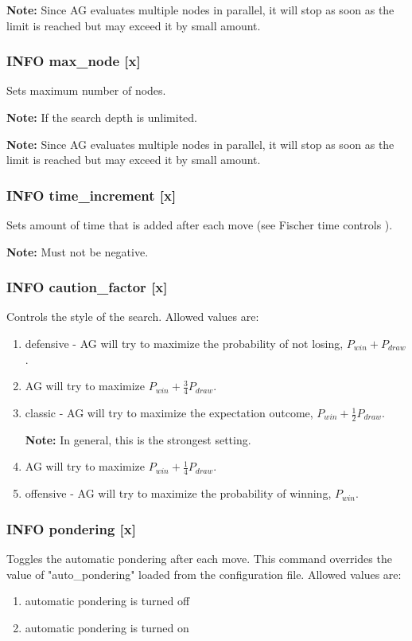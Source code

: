 \documentclass[12pt,a4paper]{article}
\begin{document}
\textbf{Note:} Since AG evaluates multiple nodes in parallel, it will stop as soon as the limit is reached but may exceed it by small amount.

\subsubsection{INFO max{\_}node [x]}
Sets maximum number of nodes.

\textbf{Note:} If  the search depth is unlimited.

\textbf{Note:} Since AG evaluates multiple nodes in parallel, it will stop as soon as the limit is reached but may exceed it by small amount.

\subsubsection{INFO time{\_}increment [x]}
Sets amount of time that is added after each move (see Fischer time controls \cite{fischer}).

\textbf{Note:} Must not be negative.

\subsubsection{INFO caution{\_}factor [x]}
Controls the style of the search. Allowed values are:
\begin{enumerate}[leftmargin=7.5em]
	\item[\text{$[x]=4$}]{defensive - AG will try to maximize the probability of not losing, $P_{win} + P_{draw}$.}
	\item[\text{$[x]=3$}]{AG will try to maximize $P_{win} + \frac{3}{4}P_{draw}$.}
	\item[\text{$[x]=2$}]{classic - AG will try to maximize the expectation outcome, $P_{win} + \frac{1}{2}P_{draw}$.
	
	\textbf{Note:} In general, this is the strongest setting.}
	\item[\text{$[x]=1$}]{AG will try to maximize $P_{win} + \frac{1}{4}P_{draw}$.}
	\item[\text{$[x]=0$}]{offensive - AG will try to maximize the probability of winning, $P_{win}$.}
\end{enumerate}

\subsubsection{INFO pondering [x]}
Toggles the automatic pondering after each move. This command overrides the value of "auto{\_}pondering" loaded from the configuration file. Allowed values are:
\begin{enumerate}[leftmargin=7.5em]
	\item[\text{$[x]=0$}]{automatic pondering is turned off}
	\item[\text{$[x]=1$}]{automatic pondering is turned on}
\end{enumerate}
\end{document}
